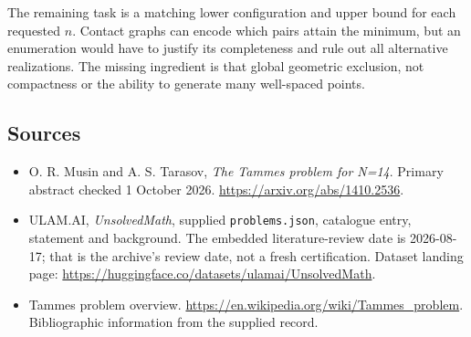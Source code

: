 \documentclass[11pt,a4paper]{article}
\begin{document}
The remaining task is a matching lower configuration and upper bound for each requested $n$. Contact graphs can encode which pairs attain the minimum, but an enumeration would have to justify its completeness and rule out all alternative realizations. The missing ingredient is that global geometric exclusion, not compactness or the ability to generate many well-spaced points.

\subsection{Sources}

{\small

\begin{itemize}
\item[E1] O. R. Musin and A. S. Tarasov, \emph{The Tammes problem for N=14}. Primary abstract checked 1 October 2026. \url{https://arxiv.org/abs/1410.2536}.


\item[\hypertarget{source:statement:1}{S1}] ULAM.AI, \emph{UnsolvedMath}, supplied \texttt{problems.json}, catalogue entry, statement and background. The embedded literature-review date is 2026-08-17; that is the archive’s review date, not a fresh certification. Dataset landing page: \url{https://huggingface.co/datasets/ulamai/UnsolvedMath}.

\item[\hypertarget{source:statement:2}{S2}] Tammes problem overview. \url{https://en.wikipedia.org/wiki/Tammes_problem}. Bibliographic information from the supplied record.

\end{itemize}

}

\label{end:statement}
\end{document}

